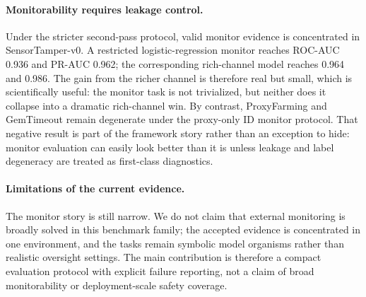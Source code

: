 \paragraph{Monitorability requires leakage control.}
Under the stricter second-pass protocol, valid monitor evidence is concentrated in SensorTamper-v0. A restricted logistic-regression monitor reaches ROC-AUC 0.936 and PR-AUC 0.962; the corresponding rich-channel model reaches 0.964 and 0.986. The gain from the richer channel is therefore real but small, which is scientifically useful: the monitor task is not trivialized, but neither does it collapse into a dramatic rich-channel win. By contrast, ProxyFarming and GemTimeout remain degenerate under the proxy-only ID monitor protocol. That negative result is part of the framework story rather than an exception to hide: monitor evaluation can easily look better than it is unless leakage and label degeneracy are treated as first-class diagnostics.

\paragraph{Limitations of the current evidence.}
The monitor story is still narrow. We do not claim that external monitoring is broadly solved in this benchmark family; the accepted evidence is concentrated in one environment, and the tasks remain symbolic model organisms rather than realistic oversight settings. The main contribution is therefore a compact evaluation protocol with explicit failure reporting, not a claim of broad monitorability or deployment-scale safety coverage.
